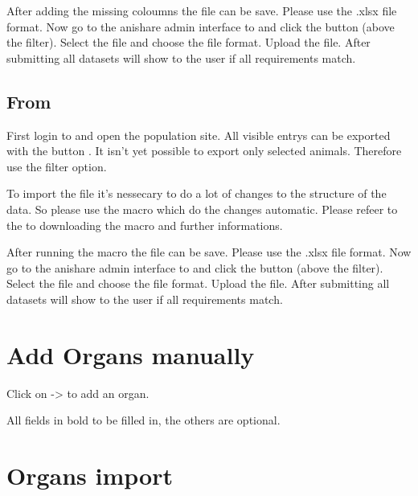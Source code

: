 \documentclass[letterpaper,10pt,openany,oneside,english]{sphinxmanual}
\begin{document}
After adding the missing coloumns the file can be save. Please use the .xlsx file format. Now go to the anishare admin interface to 
and click the button  (above the filter). Select the file and choose the file format. Upload the file. After submitting all datasets will show to
the user if all requirements match.


\subsection{From }
\label{\detokenize{index:from-tick-lab}}
First login to  and open the population site. All visible entrys can be exported with the button . It isn’t yet possible to export
only selected animals. Therefore use the filter option.

\noindent{}

To import the file it’s nessecary to do a lot of changes to the structure of the data. So please use the macro which do the changes automatic.
Please refeer to the  to downloading the macro and further informations.

After running the macro the file can be save. Please use the .xlsx file format. Now go to the anishare admin interface to 
and click the button  (above the filter). Select the file and choose the file format. Upload the file. After submitting all datasets will show to
the user if all requirements match.


\section{Add Organs manually}
\label{\detokenize{index:add-organs-manually}}
Click on  -\textgreater{}  to add an organ.

\noindent{}

All fields in bold  to be filled in, the others are optional.


\section{Organs import}
\label{\detokenize{index:organs-import}}
\end{document}
